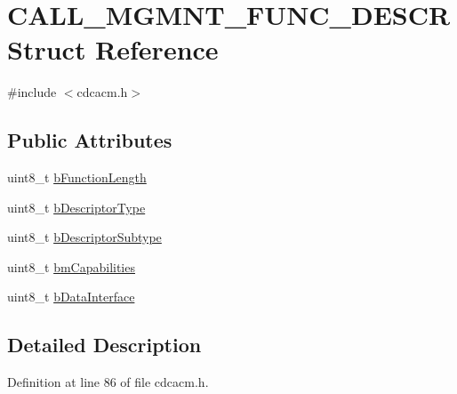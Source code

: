 \hypertarget{struct_c_a_l_l___m_g_m_n_t___f_u_n_c___d_e_s_c_r}{\section{\-C\-A\-L\-L\-\_\-\-M\-G\-M\-N\-T\-\_\-\-F\-U\-N\-C\-\_\-\-D\-E\-S\-C\-R \-Struct \-Reference}
\label{struct_c_a_l_l___m_g_m_n_t___f_u_n_c___d_e_s_c_r}
}


{\ttfamily \#include $<$cdcacm.\-h$>$}

\subsection*{\-Public \-Attributes}
\begin{DoxyCompactItemize}
\item 
uint8\-\_\-t \hyperlink{struct_c_a_l_l___m_g_m_n_t___f_u_n_c___d_e_s_c_r_ae5ab7e23e6f5268f042b1cec3986867a}{b\-Function\-Length}
\item 
uint8\-\_\-t \hyperlink{struct_c_a_l_l___m_g_m_n_t___f_u_n_c___d_e_s_c_r_ad36c57f51019212d773c8d1b70b12a77}{b\-Descriptor\-Type}
\item 
uint8\-\_\-t \hyperlink{struct_c_a_l_l___m_g_m_n_t___f_u_n_c___d_e_s_c_r_af97ef3ee2d908edaabfdde534fa15e7b}{b\-Descriptor\-Subtype}
\item 
uint8\-\_\-t \hyperlink{struct_c_a_l_l___m_g_m_n_t___f_u_n_c___d_e_s_c_r_a76161d5fa6c12239aad097f5010825c2}{bm\-Capabilities}
\item 
uint8\-\_\-t \hyperlink{struct_c_a_l_l___m_g_m_n_t___f_u_n_c___d_e_s_c_r_a83213f501eef93701807736887fc587c}{b\-Data\-Interface}
\end{DoxyCompactItemize}


\subsection{\-Detailed \-Description}


\-Definition at line 86 of file cdcacm.\-h.



